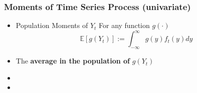 \documentclass{beamer}
\begin{document}
		
		\begin{frame}
			\frametitle{Moments of Time Series Process (univariate)}
			\begin{itemize}
				
				\large
				
				\item[]\begin{myexx*}[width=5.4in]{Population Moments of $Y_t$} For any function $g(\cdot)$
					\begin{equation*}\mathbb{E}[g(Y_t)] := \int_{-\infty}^{\infty} g(y) f_t(y)dy  \end{equation*}
				\end{myexx*}
				\pause
				\item[] The \textbf{average in the population of} $g(Y_t)$
				\vspace{12pt}\pause
				
				\item[]\hspace{12pt} {} {} \hspace{-8pt} {} 
				\vspace{18pt}\pause
				\item[]\hspace{12pt} {} {} \hspace{-8pt} {} 
			
			\end{itemize}
		\end{frame}
		
\end{document}
